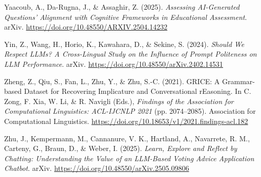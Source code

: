 \documentclass[
  12pt,
]{article}
\newlength{\cslhangindent}
\newenvironment{CSLReferences}[2] %
 {\begin{list}{}{%
  \setlength{\itemindent}{0pt}
  \setlength{\leftmargin}{0pt}
  \setlength{\parsep}{0pt}
  \ifodd #1
   \setlength{\leftmargin}{\cslhangindent}
   \setlength{\itemindent}{-1\cslhangindent}
  \fi
  \setlength{\itemsep}{#2\baselineskip}}}
 {\end{list}}
\begin{document}
\begin{CSLReferences}{1}{0}
Yaacoub, A., Da-Rugna, J., \& Assaghir, Z. (2025). \emph{Assessing {AI}-{Generated} {Questions}' {Alignment} with {Cognitive} {Frameworks} in {Educational} {Assessment}}. arXiv. \url{https://doi.org/10.48550/ARXIV.2504.14232}

Yin, Z., Wang, H., Horio, K., Kawahara, D., \& Sekine, S. (2024). \emph{Should {We} {Respect} {LLMs}? {A} {Cross}-{Lingual} {Study} on the {Influence} of {Prompt} {Politeness} on {LLM} {Performance}}. arXiv. \url{https://doi.org/10.48550/arXiv.2402.14531}

Zheng, Z., Qiu, S., Fan, L., Zhu, Y., \& Zhu, S.-C. (2021). {GRICE}: {A} {Grammar}-based {Dataset} for {Recovering} {Implicature} and {Conversational} {rEasoning}. In C. Zong, F. Xia, W. Li, \& R. Navigli (Eds.), \emph{Findings of the {Association} for {Computational} {Linguistics}: {ACL}-{IJCNLP} 2021} (pp. 2074--2085). Association for Computational Linguistics. \url{https://doi.org/10.18653/v1/2021.findings-acl.182}

Zhu, J., Kempermann, M., Cannanure, V. K., Hartland, A., Navarrete, R. M., Carteny, G., Braun, D., \& Weber, I. (2025). \emph{Learn, {Explore} and {Reflect} by {Chatting}: {Understanding} the {Value} of an {LLM}-{Based} {Voting} {Advice} {Application} {Chatbot}}. arXiv. \url{https://doi.org/10.48550/arXiv.2505.09806}

\end{CSLReferences}
\end{document}
